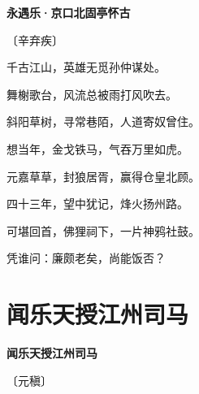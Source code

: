 \documentclass[12pt,UTF-8,openany,fontset=none]{ctexbook}
\begin{document}

\begin{center}
    {\bfseries 永遇乐·京口北固亭怀古}

    \vspace{18pt}

    \begin{large}\xuwen
        〔辛弃疾〕
    \end{large}

\end{center}

    \vspace{18pt}  %

\begin{center}
    \begin{Large}

        千古江山，英雄无觅孙仲谋处。\hspace{42pt}

        舞榭歌台，风流总被雨打风吹去。\hspace{24pt}

        斜阳草树，寻常巷陌，人道寄奴曾住。

        \hspace{18pt}想当年，金戈铁马，气吞万里如虎。

        \vspace{18pt}  %

        元嘉草草，封狼居胥，赢得仓皇北顾。

        四十三年，望中犹记，烽火扬州路。\hspace{5pt}

        可堪回首，佛狸祠下，一片神鸦社鼓。

        凭谁问：廉颇老矣，尚能饭否？\hspace{5pt}

    \end{Large}

\end{center}

\vspace{8pt}
\clearpage

\section{闻乐天授江州司马}


\begin{center}
    {\bfseries 闻乐天授江州司马}

    \vspace{18pt}

    \begin{large}\xuwen
        〔元稹〕
    \end{large}

\end{center}
\end{document}
